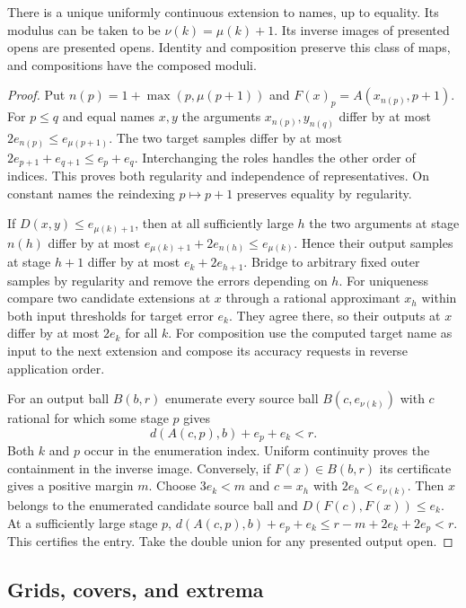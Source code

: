 \begin{theorem}\label{idx-metric124}
There is a unique uniformly continuous extension to names, up to equality.
Its modulus can be taken to be $\nu(k)=\mu(k)+1$. Its inverse images of
presented opens are presented opens. Identity and composition preserve this
class of maps, and compositions have the composed moduli.
\end{theorem}
\begin{proof}
Put $n(p)=1+\max(p,\mu(p+1))$ and
$F(x)_p=A(x_{n(p)},p+1)$. For $p\le q$ and equal names $x,y$ the arguments
$x_{n(p)},y_{n(q)}$ differ by at most $2e_{n(p)}\le e_{\mu(p+1)}$.
The two target samples differ by at most $2e_{p+1}+e_{q+1}\le e_p+e_q$.
Interchanging the roles handles the other order of indices. This proves both
regularity and independence of representatives. On constant names the
reindexing $p\mapsto p+1$ preserves equality by regularity.

If $D(x,y)\le e_{\mu(k)+1}$, then at all sufficiently large $h$ the two
arguments at stage $n(h)$ differ by at most
$e_{\mu(k)+1}+2e_{n(h)}\le e_{\mu(k)}$. Hence their output samples at
stage $h+1$ differ by at most $e_k+2e_{h+1}$. Bridge to arbitrary fixed
outer samples by regularity and remove the errors depending on $h$. For
uniqueness compare two candidate extensions at $x$ through a rational
approximant $x_h$ within both input thresholds for target error $e_k$.
They agree there, so their outputs at $x$ differ by at most $2e_k$ for all
$k$. For composition use the computed target name as input to the next
extension and compose its accuracy requests in reverse application order.

For an output ball $B(b,r)$ enumerate every source ball
$B(c,e_{\nu(k)})$ with $c$ rational for which some stage $p$ gives
\[
 d(A(c,p),b)+e_p+e_k<r.
\]
Both $k$ and $p$ occur in the enumeration index. Uniform continuity proves
the containment in the inverse image. Conversely, if $F(x)\in B(b,r)$
its certificate gives a positive margin $m$. Choose $3e_k<m$ and $c=x_h$
with $2e_h<e_{\nu(k)}$. Then $x$ belongs to the enumerated candidate
source ball and $D(F(c),F(x))\le e_k$. At a sufficiently large stage $p$,
$d(A(c,p),b)+e_p+e_k\le r-m+2e_k+2e_p<r$. This certifies the entry.
Take the double union for any presented output open.
\end{proof}

\subsection{Grids, covers, and extrema}

